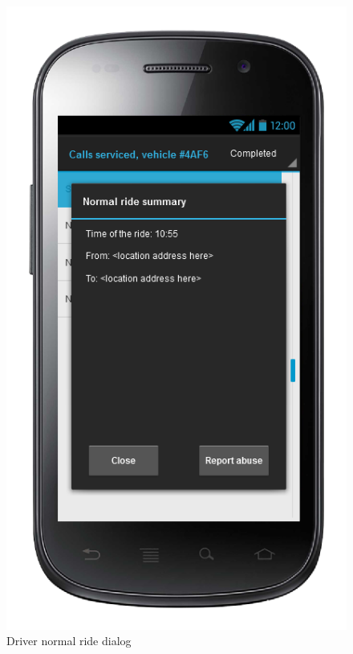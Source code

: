 \begin{center}
\begin{figure} [h]
  	  \includegraphics[scale=0.5]{ui/Driver normal ride dialog.png}
\caption{Driver normal ride dialog}
    
	\end{figure}
\end{center}

